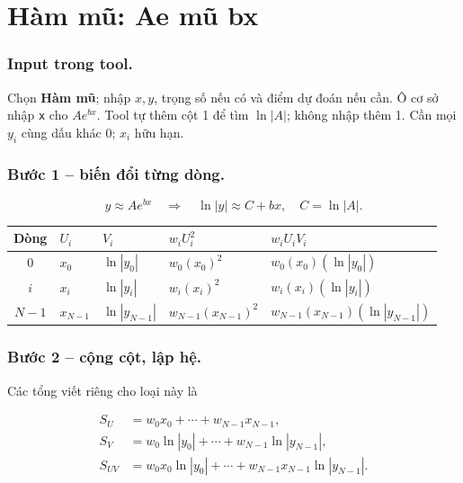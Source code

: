 \examplebreak
\section{Hàm mũ: Ae mũ bx}

\label{sec:ls-exp-log}

\subsubsection*{Input trong tool.} Chọn \textbf{Hàm mũ}; nhập $x,y$, trọng số nếu có và điểm dự đoán nếu cần. Ô cơ sở nhập \texttt{x} cho $Ae^{bx}$. Tool tự thêm cột 1 để tìm $\ln|A|$; không nhập thêm 1. Cần mọi $y_i$ cùng dấu khác 0; $x_i$ hữu hạn.

\subsubsection*{Bước 1 -- biến đổi từng dòng.}\[y\approx Ae^{bx}\quad\Longrightarrow\quad\ln|y|\approx C+bx,\quad C=\ln|A|.\]

\begin{center}\small\begin{tabular}{cllll}\toprule

Dòng&$U_i$&$V_i$&$w_iU_i^2$&$w_iU_iV_i$\\\midrule

$0$&$x_0$&$\ln|y_0|$&$w_{0}(x_0)^2$&$w_{0}(x_0)(\ln|y_0|)$\\

$i$&$x_{i}$&$\ln|y_{i}|$&$w_{i}(x_{i})^2$&$w_{i}(x_{i})(\ln|y_{i}|)$\\

$N-1$&$x_{N-1}$&$\ln|y_{N-1}|$&$w_{N-1}(x_{N-1})^2$&$w_{N-1}(x_{N-1})(\ln|y_{N-1}|)$\\

\bottomrule\end{tabular}\end{center}

\subsubsection*{Bước 2 -- cộng cột, lập hệ.} Các tổng viết riêng cho loại này là

\begin{align*}S_U&=w_0x_0+\cdots+w_{N-1}x_{N-1},\\S_V&=w_0\ln|y_0|+\cdots+w_{N-1}\ln|y_{N-1}|,\\S_{UV}&=w_0x_0\ln|y_0|+\cdots+w_{N-1}x_{N-1}\ln|y_{N-1}|.\end{align*}

